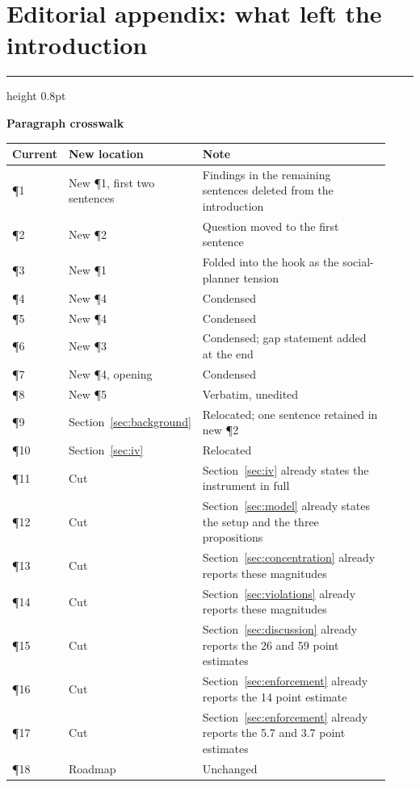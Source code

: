 \documentclass[12pt]{article}
\newenvironment{editnote}[1]{%
  \par\medskip\noindent
  \begin{minipage}{\linewidth}%
  {\color{boxrule}\hrule height 0.8pt}\smallskip
  {\sffamily\bfseries\small #1\par}\smallskip
  \small\singlespacing\raggedright
  \setlength{\parindent}{0pt}\setlength{\parskip}{0.5em}\ignorespaces
}{%
  \par\smallskip{\color{boxrule}\hrule height 0.8pt}%
  \end{minipage}\par\medskip
}
\begin{document}
\clearpage
\section*{Editorial appendix: what left the introduction}
\singlespacing

\begin{editnote}{Paragraph crosswalk}
\begin{tabular}{@{}p{0.13\linewidth}p{0.25\linewidth}p{0.55\linewidth}@{}}
\hline
\textbf{Current} & \textbf{New location} & \textbf{Note} \\
\hline
\P1 & New \P1, first two sentences & Findings in the remaining sentences deleted from the introduction \\
\P2 & New \P2 & Question moved to the first sentence \\
\P3 & New \P1 & Folded into the hook as the social-planner tension \\
\P4 & New \P4 & Condensed \\
\P5 & New \P4 & Condensed \\
\P6 & New \P3 & Condensed; gap statement added at the end \\
\P7 & New \P4, opening & Condensed \\
\P8 & New \P5 & Verbatim, unedited \\
\P9 & Section~\ref{sec:background} & Relocated; one sentence retained in new \P2 \\
\P10 & Section~\ref{sec:iv} & Relocated \\
\P11 & Cut & Section~\ref{sec:iv} already states the instrument in full \\
\P12 & Cut & Section~\ref{sec:model} already states the setup and the three propositions \\
\P13 & Cut & Section~\ref{sec:concentration} already reports these magnitudes \\
\P14 & Cut & Section~\ref{sec:violations} already reports these magnitudes \\
\P15 & Cut & Section~\ref{sec:discussion} already reports the 26 and 59 point estimates \\
\P16 & Cut & Section~\ref{sec:enforcement} already reports the 14 point estimate \\
\P17 & Cut & Section~\ref{sec:enforcement} already reports the 5.7 and 3.7 point estimates \\
\P18 & Roadmap & Unchanged \\
\hline
\end{tabular}
\end{editnote}
\end{document}
